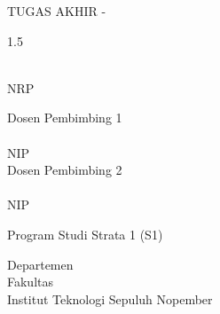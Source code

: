 {

\begin{large}
  TUGAS AKHIR - \coursecode{}
\end{large}

\vspace{\fill}

\begin{spacing}{1.5}
  \begin{Large}
    \tatitle{}
  \end{Large}
\end{spacing}

\vspace{\fill}

\begin{large}
  \name{} \\
  \textmd{NRP \nrp{}}
\end{large}

\vspace{\fill}

\begin{large}
  \textmd{Dosen Pembimbing 1} \\
  \advisor{} \\
  \textmd{NIP \advisornip{}} \\
  \vspace{\fill}
  \textmd{Dosen Pembimbing 2} \\
  \coadvisor{} \\
  \textmd{NIP \coadvisornip{}}\par
\end{large}

\vspace{\fill}

Program Studi Strata 1 (S1) \studyprogram{} \\

\mdseries

Departemen \department{} \\
Fakultas \faculty{} \\
Institut Teknologi Sepuluh Nopember

\place{} \\ \the\year{}

}

